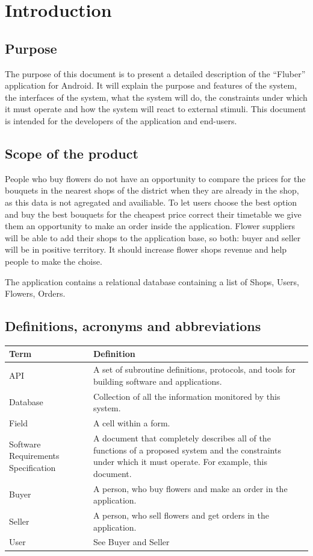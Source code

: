 \documentclass{scrreprt}
\begin{document}
\tableofcontents
\setcounter{page}{1}

\pagestyle{fancy} 
\chapter{Introduction}
\section{Purpose}
The purpose of this document is to present a detailed description of the “Fluber” application for Android. It will explain the purpose and features of the system, the interfaces of the system, what the system will do, the constraints under which it must operate and how the system will react to external stimuli. This document is intended for the developers of the application and end-users.

\section{Scope of the product}
People who buy flowers do not have an opportunity to compare the prices for the bouquets in the nearest shops of the district when they are already in the shop, as this data is not agregated and availiable. To let users choose the best option and buy the best bouquets for the cheapest price correct their timetable we give them an opportunity to make an order inside the application. Flower suppliers will be able to add their shops to the application base, so both: buyer and seller will be in positive territory. It should increase flower shops revenue and help people to make the choise.

The application contains a relational database containing a list of Shops, Users, Flowers, Orders.

\section{ Definitions, acronyms and abbreviations}
\begin{tabular}{| m{4cm} | m{10cm} |}
	\hline
	\textbf{Term} & \textbf{Definition} \\ \hline
	API & A set of subroutine definitions, protocols, and tools for building software and applications.  \\ \hline
	Database &  Collection of all the information monitored by this system.\\ \hline
	Field  & A cell within a form. \\ \hline
	Software Requirements Specification & 
	A document that completely describes all of the functions of a proposed system and the constraints under which it must operate. For example, this document. \\ \hline
	Buyer & A person, who buy flowers and make an order in the application. \\ \hline
	Seller & A person, who sell flowers and get orders in the application. \\ \hline
	User & See Buyer and Seller\\
	\hline
\end{tabular}
\end{document}
